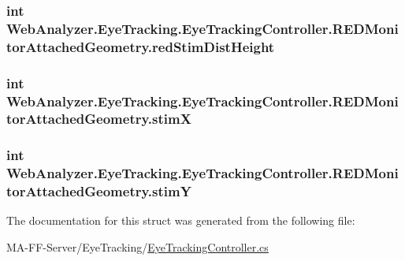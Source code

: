 \subsubsection[{red\+Stim\+Dist\+Height}]{\setlength{\rightskip}{0pt plus 5cm}int Web\+Analyzer.\+Eye\+Tracking.\+Eye\+Tracking\+Controller.\+R\+E\+D\+Monitor\+Attached\+Geometry.\+red\+Stim\+Dist\+Height}\label{struct_web_analyzer_1_1_eye_tracking_1_1_eye_tracking_controller_1_1_r_e_d_monitor_attached_geometry_af61588e67a4886a43bf75e828aba6c26}
\hypertarget{struct_web_analyzer_1_1_eye_tracking_1_1_eye_tracking_controller_1_1_r_e_d_monitor_attached_geometry_afa74843ca98b6917acf93ae7eb33e788}{}
\subsubsection[{stim\+X}]{\setlength{\rightskip}{0pt plus 5cm}int Web\+Analyzer.\+Eye\+Tracking.\+Eye\+Tracking\+Controller.\+R\+E\+D\+Monitor\+Attached\+Geometry.\+stim\+X}\label{struct_web_analyzer_1_1_eye_tracking_1_1_eye_tracking_controller_1_1_r_e_d_monitor_attached_geometry_afa74843ca98b6917acf93ae7eb33e788}
\hypertarget{struct_web_analyzer_1_1_eye_tracking_1_1_eye_tracking_controller_1_1_r_e_d_monitor_attached_geometry_a46c7e6958d80fe749b8df93404a9bbc5}{}
\subsubsection[{stim\+Y}]{\setlength{\rightskip}{0pt plus 5cm}int Web\+Analyzer.\+Eye\+Tracking.\+Eye\+Tracking\+Controller.\+R\+E\+D\+Monitor\+Attached\+Geometry.\+stim\+Y}\label{struct_web_analyzer_1_1_eye_tracking_1_1_eye_tracking_controller_1_1_r_e_d_monitor_attached_geometry_a46c7e6958d80fe749b8df93404a9bbc5}


The documentation for this struct was generated from the following file\+:\begin{DoxyCompactItemize}
\item 
M\+A-\/\+F\+F-\/\+Server/\+Eye\+Tracking/\hyperlink{_eye_tracking_controller_8cs}{Eye\+Tracking\+Controller.\+cs}\end{DoxyCompactItemize}

